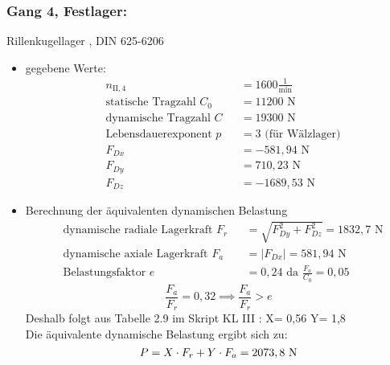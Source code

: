 \subsubsection{Gang 4, Festlager:} Rillenkugellager , DIN 625-6206\\
\begin{itemize}
	\item gegebene Werte:
	\begin{align*}
	&n_{{\mathord{\mathrm{II}},4}} &&=  1600 \frac{1}{\text{min}} \\
	&\text{statische Tragzahl } C_{0} &&= 11200 \text{ N}\\
	&\text{dynamische Tragzahl } C &&= 19300 \text{ N} \\
	&\text{Lebensdauerexponent } p &&= 3 \text{ (für Wälzlager)} \\
	&F_{Dx} && = -581,94 \text{ N}\\
	&F_{Dy} && = 710,23 \text{ N}\\
	&F_{Dz} && = -1689,53 \text{ N}
	\end{align*} 
	\item Berechnung der äquivalenten dynamischen Belastung
	\begin{align*}
	&\text{dynamische radiale Lagerkraft } F_r&& = \sqrt{F_{Dy}^2 + F_{Dz}^2 } =1832,7\text{ N} \\
	&\text{dynamische axiale Lagerkraft } F_a&& = |F_{Dx}| = 581,94 \text{ N}\\
	&\text{Belastungsfaktor } e &&= 0,24 \text{ da } \frac{F_a}{C_0} = 0,05
	\end{align*} 
	\[\frac{F_a}{F_r} = 0,32 \implies \frac{F_a}{F_r} > e\]
	Deshalb folgt aus Tabelle 2.9 im Skript KL III : X= 0,56 \text{, } Y= 1,8 \\
	Die äquivalente dynamische Belastung ergibt sich zu: 
	\[
	P= X \cdot F_r + Y \cdot F_a= 2073,8 \text{ N}
	\]
\end{itemize}
\newpage
